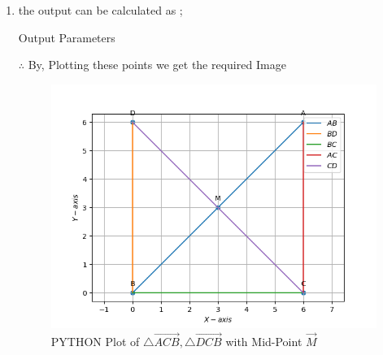 \documentclass[10pt]{article}
\begin{document}
\begin{enumerate}
\begin{enumerate}
\item the output can be calculated as ;
\begin{table}[H]
\centering
	
	  \caption{Output Parameters}
	  \label{Table-2:Output_params}
\end{table}

		$\therefore$ By, Plotting these points we get the required Image 

\begin{figure}[H]
	\includegraphics[width = \columnwidth]{figs/python_plot.png}
    \caption{PYTHON Plot of $\triangle \vec{ACB} ,\triangle \vec{DCB}$ with Mid-Point $\vec{M}$}
    \label{fig:fig-2}
\end{figure}
\end{enumerate}
\end{enumerate}
\end{document}
